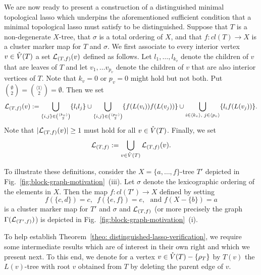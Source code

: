 We are now ready to present a construction of a distinguished minimal
topological lasso which underpins the aforementioned sufficient condition that
a minimal topological lasso must satisfy to be distinguished.  Suppose that
$T$ is a non-degenerate $X$-tree, that $\sigma$ is a total ordering of $X$,
and that $f:cl(T)\to X$ is a cluster marker map for $T$ and $\sigma$. We first
associate to every interior vertex $v\in \mathring{V}(T)$ a set ${\mathcal L}_{(T,f)} (v)$
defined as follows. Let $l_1,\ldots, l_{k_v}$ denote the children of $v$ that
are leaves of $T$ and let $v_1,\ldots v_{p_v}$ denote the children of $v$ that
are also interior vertices of $T$. Note that $k_v=0$ or $p_v=0$ might hold but
not both. Put ${\emptyset \choose 2}={\langle 1\rangle \choose
  2}=\emptyset$. Then we set
$$
{\mathcal L}_{(T,f)}(v):=\bigcup_{\{i,j\}\in {\langle k_v\rangle\choose 2}}\{l_il_j\}
\cup
\bigcup_{\{i,j\}\in {\langle p_v\rangle\choose 2}}\{f(L(v_i))f(L(v_j))\}
\cup
\bigcup_{i\in \langle k_v\rangle,\,\,j\in \langle p_v\rangle} 
\{l_if(L(v_j))\}.
$$
Note that $|{\mathcal L}_{(T,f)}(v)|\geq 1$ must hold for all $v\in \mathring{V}(T)$. Finally,
we set
$$
{\mathcal L}_{(T,f)}:=\bigcup_{v\in \mathring{V}(T)} {\mathcal L}_{(T,f)}(v).
$$

To illustrate these definitions, consider the $X=\{a,\ldots, f\}$-tree $T'$
depicted in Fig.~\ref{fig:block-graph-motivation}~(iii).  Let $\sigma$ denote
the lexicographic ordering of the elements in $X$. Then the map $f:cl(T')\to
X$ defined by setting
$$
f(\{c,d\})=c, \,\,\,
f(\{e,f\})=e,\,\,\mbox{ and } f(X-\{b\})=a
$$
is a cluster marker map for $T'$ and $\sigma$ and 
${\mathcal L}_{(T,f)}$
(or more precisely the graph $\Gamma({\mathcal L}_{(T',f)})$) is depicted in
Fig.~\ref{fig:block-graph-motivation}~(i).

To help establish Theorem~\ref{theo: distinguished-lasso-verification}, we
require some intermediate results which are of interest in their own right and
which we present next. To this end, we denote for a vertex $v\in
\mathring{V}(T)-\{\rho_T\}$ by $T(v)$ the $L(v)$-tree with root $v$ obtained from $T$
by deleting the parent edge of $v$.

